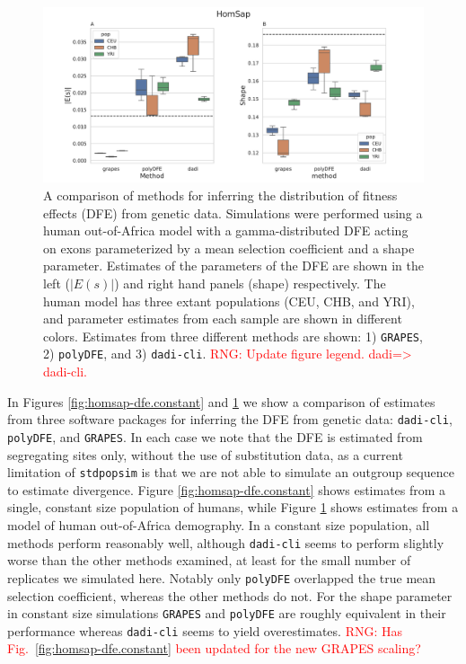 \documentclass[hidelinks]{article}
\newcommand{\stdpopsim}{\texttt{stdpopsim}\xspace}
\newcommand{\polydfe}{\texttt{polyDFE}\xspace}
\newcommand{\dadicli}{\texttt{dadi-cli}\xspace}
\newcommand{\grapes}{\texttt{GRAPES}\xspace}
\newcommand{\rngcomment}[1]{\textcolor{red}{RNG: #1}}
\begin{document}
    \begin{figure}[htbp]
        \centering
        \includegraphics[width=\linewidth]{figures/HomSap/OOA/HomSap_OutOfAfricaArchaicAdmixture_5R19_Gamma_K17_ensembl_havana_104_exons_DFE_plot}
        \caption{A comparison of methods for inferring the distribution of fitness effects (DFE) from genetic data.
        Simulations were performed using a human out-of-Africa model \citep{ragsdale2019models} with a gamma-distributed DFE
        acting on exons parameterized by a mean selection coefficient and a shape parameter. Estimates of the 
        parameters of the DFE are shown in the left ($\lvert E(s) \rvert $) and right hand panels (shape) respectively.
        The human model has three extant populations (CEU, CHB, and YRI), and parameter estimates from each
        sample are shown in different colors.
        Estimates from three different methods are shown: 1) \grapes \cite{galtier2016adaptive}, 2) \polydfe \citep{tataru2020polydfe},
        and 3) \dadicli \citep{Huang2023}.
            \rngcomment{Update figure legend. dadi=> dadi-cli.}
}
        \label{fig:homsap-dfe.ooa}
    \end{figure}

    In Figures \ref{fig:homsap-dfe.constant} and \ref{fig:homsap-dfe.ooa} we show a comparison of estimates
    from three software packages for inferring the DFE from genetic data:
    \dadicli \citep{Huang2023}, \polydfe \citep{tataru2020polydfe}, 
    and \grapes \citep{galtier2016adaptive}.
    In each case we note that the DFE is estimated from segregating sites only,
    without the use of substitution data, as a current limitation of \stdpopsim
    is that we are not able to simulate an outgroup sequence to estimate
    divergence. 
    Figure \ref{fig:homsap-dfe.constant} shows estimates from a single, constant size population of humans, 
    while Figure \ref{fig:homsap-dfe.ooa} shows estimates from a model of human out-of-Africa demography.
    In a constant size population, all methods perform reasonably well, although \dadicli seems to
    perform slightly worse than the other methods examined, at least for the small number of replicates we simulated here.
    Notably only \polydfe overlapped the true mean selection coefficient, whereas 
    the other methods do not. 
    For the shape parameter in constant size simulations \grapes and \polydfe are roughly
    equivalent in their performance whereas \dadicli seems to yield overestimates. 
    \rngcomment{Has Fig.~\ref{fig:homsap-dfe.constant} been updated for the new GRAPES scaling?}
    
\end{document}
